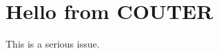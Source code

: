 \documentclass[../main]{subfiles}
\begin{document}
\ifSubfilesClassLoaded{
    \tikzexternalize[prefix=figcache/]
} {
}

\section {Hello from COUTER}

This is a serious issue.
\end{document}
